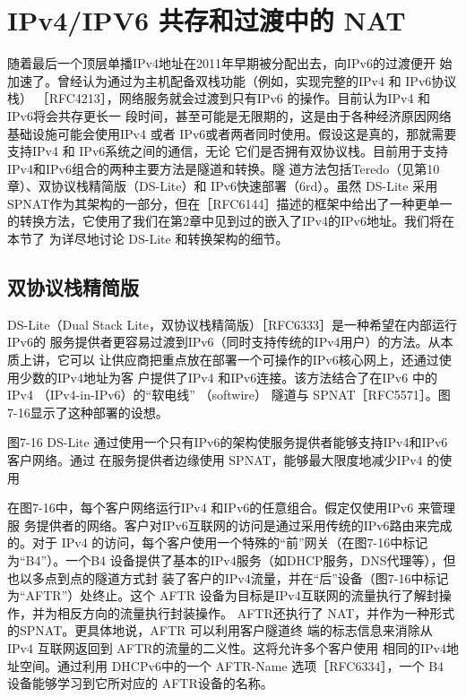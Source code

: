 \section{IPv4/IPV6 共存和过渡中的 NAT}

随着最后一个顶层单播IPv4地址在2011年早期被分配出去，向IPv6的过渡便开
始加速了。曾经认为通过为主机配备双栈功能（例如，实现完整的IPv4 和 IPv6协议栈）
［RFC4213］，网络服务就会过渡到只有IPv6 的操作。目前认为IPv4 和 IPv6将会共存更长一
段时间，甚至可能是无限期的，这是由于各种经济原因网络基础设施可能会使用IPv4 或者
IPv6或者两者同时使用。假设这是真的，那就需要支持IPv4 和 IPv6系统之间的通信，无论
它们是否拥有双协议栈。目前用于支持IPv4和IPv6组合的两种主要方法是隧道和转换。隧
道方法包括Teredo（见第10章）、双协议栈精简版（DS-Lite）和 IPv6快速部署（6rd）。虽然
DS-Lite 采用SPNAT作为其架构的一部分，但在［RFC6144］描述的框架中给出了一种更单一
的转换方法，它使用了我们在第2章中见到过的嵌入了IPv4的IPv6地址。我们将在本节了
为详尽地讨论 DS-Lite 和转换架构的细节。

\subsection{双协议栈精简版}

DS-Lite（Dual Stack Lite，双协议栈精简版）［RFC6333］是一种希望在内部运行IPv6的
服务提供者更容易过渡到IPv6（同时支持传统的IPv4用户）的方法。从本质上讲，它可以
让供应商把重点放在部署一个可操作的IPv6核心网上，还通过使用少数的IPv4地址为客
户提供了IPv4 和IPv6连接。该方法结合了在IPv6 中的IPv4 （IPv4-in-IPv6）的“软电线”
（softwire） 隧道与 SPNAT［RFC5571］。图7-16显示了这种部署的设想。

图7-16
DS-Lite 通过使用一个只有IPv6的架构使服务提供者能够支持IPv4和IPv6 客户网络。通过
在服务提供者边缘使用 SPNAT，能够最大限度地减少IPv4 的使用

在图7-16中，每个客户网络运行IPv4 和IPv6的任意组合。假定仅使用IPv6 来管理服
务提供者的网络。客户对IPv6互联网的访问是通过采用传统的IPv6路由来完成的。对于
IPv4 的访问，每个客户使用一个特殊的“前”网关（在图7-16中标记为“B4”）。一个B4
设备提供了基本的IPv4服务（如DHCP服务，DNS代理等），但也以多点到点的隧道方式封
装了客户的IPv4流量，并在“后”设备（图7-16中标记为“AFTR”）处终止。这个 AFTR
设备为目标是IPv4互联网的流量执行了解封操作，并为相反方向的流量执行封装操作。
AFTR还执行了 NAT，并作为一种形式的SPNAT。更具体地说，AFTR 可以利用客户隧道终
端的标志信息来消除从 IPv4 互联网返回到 AFTR的流量的二义性。这将允许多个客户使用
相同的IPv4地址空间。通过利用 DHCPv6中的一个 AFTR-Name 选项［RFC6334］，一个 B4
设备能够学习到它所对应的 AFTR设备的名称。

